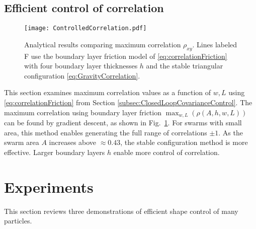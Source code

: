 \subsection{Efficient control of correlation}
\begin{figure}
\begin{center}
	\texttt{[image: ControlledCorrelation.pdf]}
\end{center}
\vspace{-1em}
\caption{\label{fig:ControlledCorrelation}
Analytical results comparing maximum correlation $\rho_{xy}$. Lines labeled \textsf{F} use the boundary layer friction model of \eqref{eq:correlationFriction} with four boundary layer thicknesses $h$ and the stable triangular configuration \eqref{eq:GravityCorrelation}.
}\end{figure}

This section examines maximum correlation values as a function of  $w,L$ using \eqref{eq:correlationFriction}
from Section  \ref{subsec:ClosedLoopCovarianceControl}. 
The maximum correlation using boundary layer friction $\displaystyle  \max_{w,L} \left( \rho(A,h,w,L) \right)$ can be found by gradient descent, as shown in Fig.~\ref{fig:ControlledCorrelation}. 
For swarms with small area, this method enables generating the full range of correlations $\pm 1$. %
  As  the swarm area $A$ increases above $\approx 0.43$, the stable configuration method is more effective.
Larger boundary layers $h$ enable more control of correlation.





\section{Experiments}\label{sec:Experiments}
This section reviews three demonstrations of efficient shape control of many particles.
